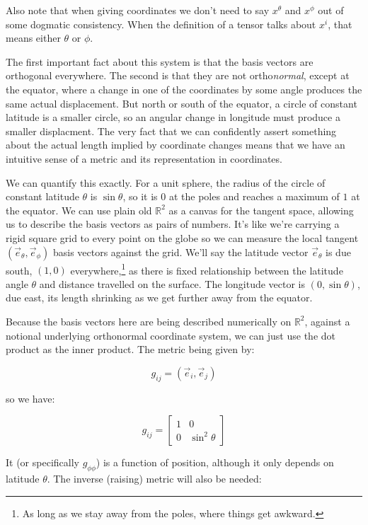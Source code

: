 Also note that when giving coordinates we don't need to say $x^{\theta}$ and $x^{\phi}$ out of some dogmatic consistency. When the definition of a tensor talks about $x^i$, that means either $\theta$ or $\phi$.

The first important fact about this system is that the basis vectors are orthogonal everywhere. The second is that they are not ortho\textit{normal}, except at the equator, where a change in one of the coordinates by some angle produces the same actual displacement. But north or south of the equator, a circle of constant latitude is a smaller circle, so an angular change in longitude must produce a smaller displacment. The very fact that we can confidently assert something about the actual length implied by coordinate changes means that we have an intuitive sense of a metric and its representation in coordinates.

We can quantify this exactly. For a unit sphere, the radius of the circle of constant latitude $\theta$ is $\sin \theta$, so it is $0$ at the poles and reaches a maximum of $1$ at the equator. We can use plain old $\mathbb{R}^2$ as a canvas for the tangent space, allowing us to describe the basis vectors as pairs of numbers. It's like we're carrying a rigid square grid to every point on the globe so we can measure the local tangent $(\vec{e}_{\theta}, \vec{e}_{\phi})$ basis vectors against the grid. We'll say the latitude vector $\vec{e}_{\theta}$ is due south, $(1, 0)$ everywhere,\footnote{As long as we stay away from the poles, where things get awkward.} as there is fixed relationship between the latitude angle $\theta$ and distance travelled on the surface. The longitude vector is $(0, \sin \theta)$, due east, its length shrinking as we get further away from the equator.

Because the basis vectors here are being described numerically on $\mathbb{R}^2$, against a notional underlying orthonormal coordinate system, we can just use the dot product as the inner product. The metric being given by:

$$
g_{ij} = (\vec{e}_i,\vec{e}_j)
$$

so we have:

$$
g_{ij} = \begin{bmatrix}1 & 0 \\ 0 & \sin^2 \theta\end{bmatrix} 
$$

It (or specifically $g_{\phi\phi}$) is a function of position, although it only depends on latitude $\theta$. The inverse (raising) metric will also be needed:


